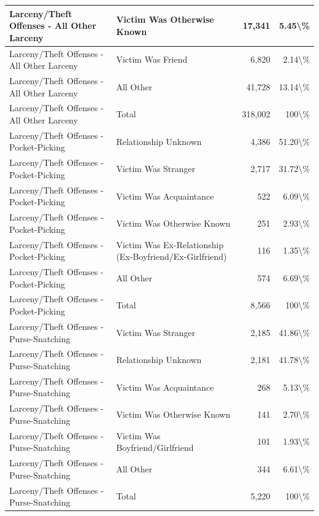 \documentclass[
]{krantz}
\begin{document}
\begin{longtable}[t]{l|l|r|r}
\hline
Larceny/Theft Offenses - All Other Larceny & Victim Was Otherwise Known & 17,341 & 5.45\textbackslash{}\%\\
\hline
Larceny/Theft Offenses - All Other Larceny & Victim Was Friend & 6,820 & 2.14\textbackslash{}\%\\
\hline
Larceny/Theft Offenses - All Other Larceny & All Other & 41,728 & 13.14\textbackslash{}\%\\
\hline
Larceny/Theft Offenses - All Other Larceny & Total & 318,002 & 100\textbackslash{}\%\\
\hline
Larceny/Theft Offenses - Pocket-Picking & Relationship Unknown & 4,386 & 51.20\textbackslash{}\%\\
\hline
Larceny/Theft Offenses - Pocket-Picking & Victim Was Stranger & 2,717 & 31.72\textbackslash{}\%\\
\hline
Larceny/Theft Offenses - Pocket-Picking & Victim Was Acquaintance & 522 & 6.09\textbackslash{}\%\\
\hline
Larceny/Theft Offenses - Pocket-Picking & Victim Was Otherwise Known & 251 & 2.93\textbackslash{}\%\\
\hline
Larceny/Theft Offenses - Pocket-Picking & Victim Was Ex-Relationship (Ex-Boyfriend/Ex-Girlfriend) & 116 & 1.35\textbackslash{}\%\\
\hline
Larceny/Theft Offenses - Pocket-Picking & All Other & 574 & 6.69\textbackslash{}\%\\
\hline
Larceny/Theft Offenses - Pocket-Picking & Total & 8,566 & 100\textbackslash{}\%\\
\hline
Larceny/Theft Offenses - Purse-Snatching & Victim Was Stranger & 2,185 & 41.86\textbackslash{}\%\\
\hline
Larceny/Theft Offenses - Purse-Snatching & Relationship Unknown & 2,181 & 41.78\textbackslash{}\%\\
\hline
Larceny/Theft Offenses - Purse-Snatching & Victim Was Acquaintance & 268 & 5.13\textbackslash{}\%\\
\hline
Larceny/Theft Offenses - Purse-Snatching & Victim Was Otherwise Known & 141 & 2.70\textbackslash{}\%\\
\hline
Larceny/Theft Offenses - Purse-Snatching & Victim Was Boyfriend/Girlfriend & 101 & 1.93\textbackslash{}\%\\
\hline
Larceny/Theft Offenses - Purse-Snatching & All Other & 344 & 6.61\textbackslash{}\%\\
\hline
Larceny/Theft Offenses - Purse-Snatching & Total & 5,220 & 100\textbackslash{}\%\\

\end{longtable}
\end{document}
